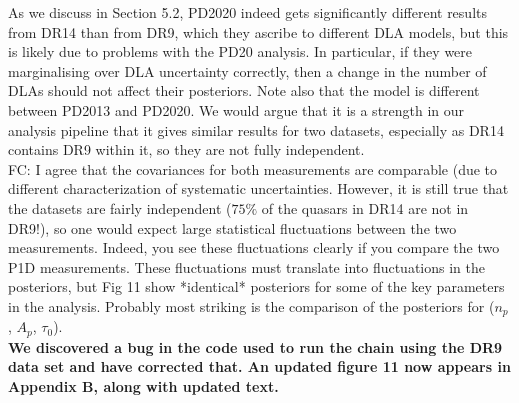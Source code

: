 \documentclass[12pt]{article}
\begin{document}
As we discuss in Section 5.2, PD2020 indeed gets significantly different results from DR14 than from DR9, which they ascribe to different DLA models, but this is likely due to problems with the PD20 analysis. In particular, if they were marginalising over DLA uncertainty correctly, then a change in the number of DLAs should not affect their posteriors. Note also that the model is different between PD2013 and PD2020.  We would argue that it is a strength in our analysis pipeline that it gives similar results for two datasets, especially as DR14 contains DR9 within it, so they are not fully independent.\\

FC: I agree that the covariances for both measurements are comparable (due to different characterization of systematic uncertainties. However, it is still true that the datasets are fairly independent ($75\%$ of the quasars in DR14 are not in DR9!), so one would expect large statistical fluctuations between the two measurements. Indeed, you see these fluctuations clearly if you compare the two P1D measurements. These fluctuations must translate into fluctuations in the posteriors, but Fig 11 show *identical* posteriors for some of the key parameters in the analysis. Probably most striking is the comparison of the posteriors for ($n_p$, $A_p$, $\tau_0$).\\

\textbf{We discovered a bug in the code used to run the chain using the DR9 data set and have corrected that. An updated figure 11 now appears in Appendix B, along with updated text.}
\end{document}
